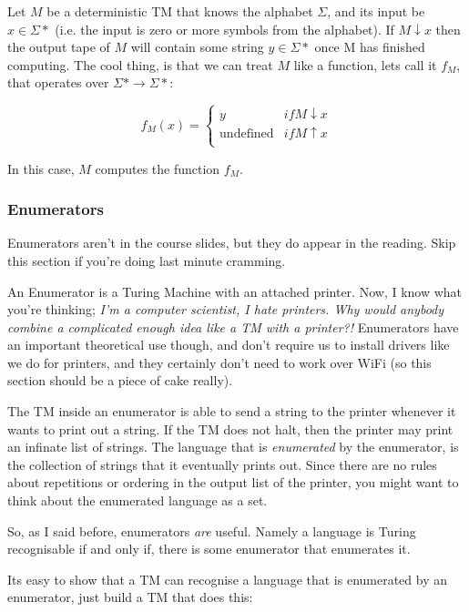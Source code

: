 Let $M$ be a deterministic TM that knows the alphabet $\Sigma$, and its input be
$x \in \Sigma*$ (i.e. the input is zero or more symbols from the alphabet). If
$M \downarrow x$ then the output tape of $M$ will contain some string $y \in
\Sigma*$ once M has finished computing. The cool thing, is that we can treat $M$
like a function, lets call it $f_M$, that operates over $\Sigma* \rightarrow
\Sigma*$:

\[
  f_M(x) = \begin{cases}
       y & if M \downarrow x\\
       \text{undefined} & if M \uparrow x\\
     \end{cases}
\]

In this case, $M$ computes the function $f_M$.

\subsubsection{Enumerators}

Enumerators aren't in the course slides, but they do appear in the reading. Skip
this section if you're doing last minute cramming.

An Enumerator is a Turing Machine with an attached printer. Now, I know what
you're thinking; \textit{I'm a computer scientist, I hate printers. Why would
anybody combine a complicated enough idea like a TM with a printer?!}
Enumerators have an important theoretical use though, and don't require us to
install drivers like we do for printers, and they certainly don't need to work
over WiFi (so this section should be a piece of cake really).

The TM inside an enumerator is able to send a string to the printer whenever it
wants to print out a string. If the TM does not halt, then the printer may print
an infinate list of strings. The language that is \textit{enumerated} by the
enumerator, is the collection of strings that it eventually prints out. Since
there are no rules about repetitions or ordering in the output list of the
printer, you might want to think about the enumerated language as a set.

So, as I said before, enumerators \textit{are} useful. Namely a language is
Turing recognisable if and only if, there is some enumerator that enumerates it.

Its easy to show that a TM can recognise a language that is enumerated by an
enumerator, just build a TM that does this:

